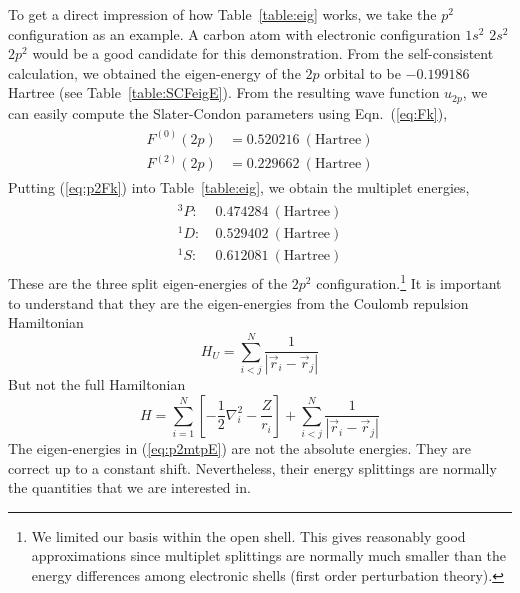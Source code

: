 To get a direct impression of how Table~\ref{table:eig} works, we take the $p^2$
configuration as an example. A carbon atom with electronic configuration
$1s^2$ $2s^2$ $2p^2$ would be a good candidate for this demonstration.
From the self-consistent calculation, we obtained the eigen-energy of the
$2p$ orbital to be $-0.199186$ Hartree (see Table~\ref{table:SCFeigE}).
From the resulting wave function $u_{2p}$, we can easily compute the
Slater-Condon parameters using Eqn.~(\ref{eq:Fk}),
\begin{align} \label{eq:p2Fk}
\begin{split}
F^{(0)}(2p) & = 0.520216\ (\text{Hartree}) \\
F^{(2)}(2p) & = 0.229662\ (\text{Hartree})
\end{split}
\end{align}
Putting (\ref{eq:p2Fk}) into Table~\ref{table:eig}, we obtain the multiplet energies,
\begin{align} \label{eq:p2mtpE}
\begin{split}
^3P: &\ 0.474284\ (\text{Hartree}) \\
^1D: &\ 0.529402\ (\text{Hartree}) \\
^1S: &\ 0.612081\ (\text{Hartree})
\end{split}
\end{align}
%
These are the three split eigen-energies of the $2p^2$ configuration.\footnote{We
limited our basis within the open shell. This gives reasonably good approximations since
multiplet splittings are normally much smaller than the energy differences among electronic
shells (first order perturbation theory).}
It is important to understand that they are the eigen-energies
from the Coulomb repulsion Hamiltonian
\begin{equation}
H_U = \sum_{i<j}^N \frac{1}{|\vec{r}_i - \vec{r}_j|}
\end{equation}
But not the full Hamiltonian
\begin{equation}
H = \sum_{i=1}^N \left[ -\frac{1}{2} \nabla_i^2 - \frac{Z}{r_i} \right] + \sum_{i<j}^N \frac{1}{|\vec{r}_i - \vec{r}_j|}
\end{equation}
%
The eigen-energies in (\ref{eq:p2mtpE}) are not the absolute energies.
They are correct up to a constant shift. Nevertheless, their energy splittings
are normally the quantities that we are interested in.
